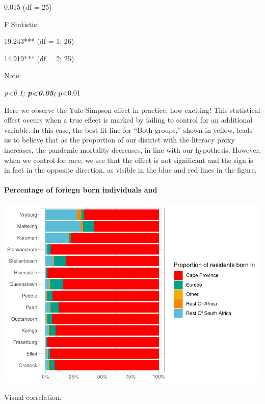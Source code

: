 \documentclass[fleqn,10pt,lineno]{wlpeerj} %
\begin{document}
0.015 (df = 25)

F Statistic

19.243*** (df = 1; 26)

14.919*** (df = 2; 25)

Note:

\emph{p\textless0.1; \textbf{p\textless0.05; }}p\textless0.01

Here we observe the Yule-Simpson effect in practice, how exciting! This statistical effect occurs when a true effect is marked by failing to control for an additional variable. In this case, the best fit line for ``Both groups,'' shown in yellow, leads us to believe that as the proportion of our district with the literacy proxy increases, the pandemic mortality decreases, in line with our hypothesis. However, when we control for race, we see that the effect is not significant and the sign is in fact in the opposite direction, as visible in the blue and red lines in the figure.

\hypertarget{percentage-of-foriegn-born-individuals-and}{%
\paragraph{Percentage of foriegn born individuals and}\label{percentage-of-foriegn-born-individuals-and}}

\includegraphics{spanish-flu-mortality_bookdown_files/figure-latex/unnamed-chunk-23-1.pdf}

Visual correlation.
\end{document}
